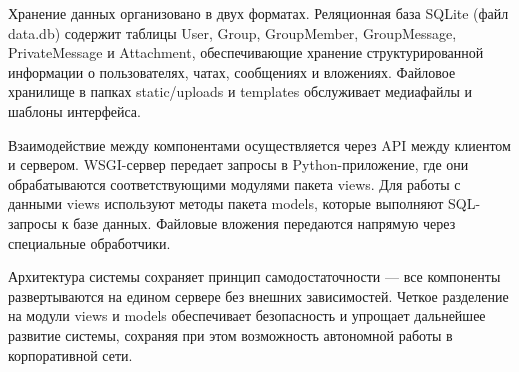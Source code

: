 Хранение данных организовано в двух форматах. Реляционная база SQLite (файл data.db) содержит таблицы User, Group, GroupMember, GroupMessage, PrivateMessage и Attachment, обеспечивающие хранение структурированной информации о пользователях, чатах, сообщениях и вложениях. Файловое хранилище в папках static/uploads и templates обслуживает медиафайлы и шаблоны интерфейса.

Взаимодействие между компонентами осуществляется через API между клиентом и сервером. WSGI-сервер передает запросы в Python-приложение, где они обрабатываются соответствующими модулями пакета views. Для работы с данными views используют методы пакета models, которые выполняют SQL-запросы к базе данных. Файловые вложения передаются напрямую через специальные обработчики.

Архитектура системы сохраняет принцип самодостаточности — все компоненты развертываются на едином сервере без внешних зависимостей. Четкое разделение на модули views и models обеспечивает безопасность и упрощает дальнейшее развитие системы, сохраняя при этом возможность автономной работы в корпоративной сети.

